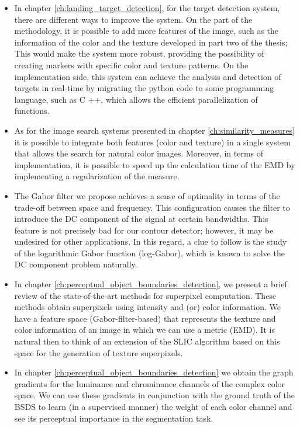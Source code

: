 \begin{itemize}
	\item In chapter \ref{ch:landing_target_detection}, for the target detection system, there are different ways to improve the system. On the part of the methodology, it is possible to add more features of the image, such as the information of the color and the texture developed in part two of the thesis; This would make the system more robust, providing the possibility of creating markers with specific color and texture patterns. On the implementation side, this system can achieve the analysis and detection of targets in real-time by migrating the python code to some programming language, such as C ++, which allows the efficient parallelization of functions.
	
	 \item As for the image search systems presented in chapter \ref{ch:similarity_measures} it is possible to integrate both features (color and texture) in a single system that allows the search for natural color images. Moreover, in terms of implementation, it is possible to speed up the calculation time of the EMD by implementing a regularization of the measure.
	 
	 \item The Gabor filter we propose achieves a sense of optimality in terms of the trade-off between space and frequency. This configuration causes the filter to introduce the DC component of the signal at certain bandwidths. This feature is not precisely bad for our contour detector; however, it may be undesired for other applications. In this regard, a clue to follow is the study of the logarithmic Gabor function (log-Gabor), which is known to solve the DC component problem naturally.
	 
	 \item In chapter \ref{ch:perceptual_object_boundaries_detection}, we present a brief review of the state-of-the-art methods for superpixel computation. These methods obtain superpixels using intensity and (or) color information. We have a feature space (Gabor-filter-based) that represents the texture and color information of an image in which we can use a metric (EMD). It is natural then to think of an extension of the SLIC algorithm based on this space for the generation of texture superpixels. 
	 
	 \item In chapter \ref{ch:perceptual_object_boundaries_detection} we obtain the graph gradients for the luminance and chrominance channels of the complex color space. We can use these gradients in conjunction with the ground truth of the BSDS to learn (in a supervised manner) the weight of each color channel and see its perceptual importance in the segmentation task.
	 

\end{itemize}
